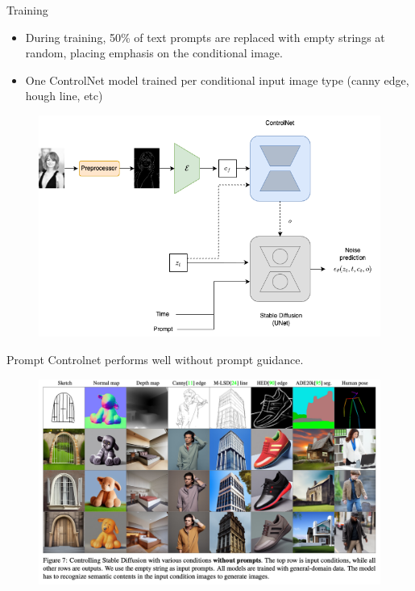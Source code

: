\documentclass[8pt]{beamer}
\begin{document}
\begin{frame}{Training}
    \fontsize{7pt}{7pt}\selectfont
    \begin{itemize}
        \item During training, 50\% of text prompts are replaced with empty strings at random, placing emphasis on the conditional image.
        \item One ControlNet model trained per conditional input image type (canny edge, hough line, etc)
    \end{itemize}
    \begin{figure}
        \includegraphics[scale=0.25]{images/cn_training}
        \label{fig:control_net_training}
    \end{figure}
\end{frame}



\begin{frame}{Prompt}
    \fontsize{7pt}{7pt}\selectfont
    Controlnet performs well without prompt guidance.
    \begin{figure}
        \includegraphics[scale=0.2]{images/cn_no_prompt}
        \label{fig:control_net_training}
    \end{figure}
\end{frame}
\end{document}
